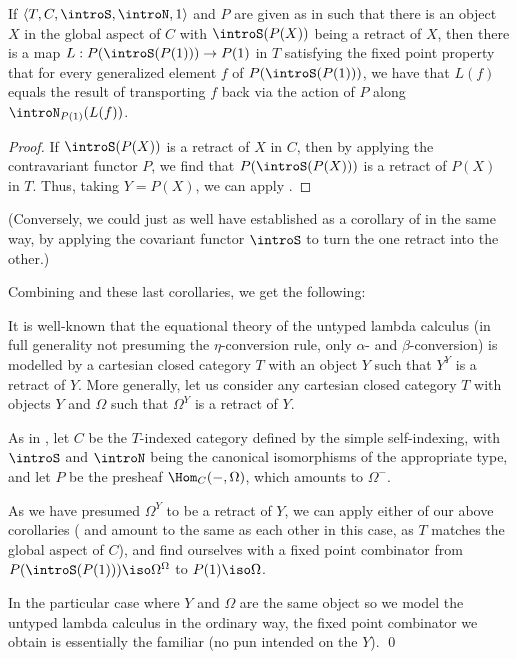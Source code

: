 \begin{corollary}\label{RetractInC}
If $\langle T, C, \introS, \introN, 1 \rangle$ and $P$ are given as in  such that there is an object $X$ in the global aspect of $C$ with $\introS(P(X))$ being a retract of $X$, then there is a map $L : P(\introS(P(1))) \to P(1)$ in $T$ satisfying the fixed point property that for every generalized element $f$ of $P(\introS(P(1)))$, we have that $L(f)$ equals the result of transporting $f$ back via the action of $P$ along $\introN_{P(1)}(L(f))$.
\end{corollary}
\begin{proof}
If $\introS(P(X))$ is a retract of $X$ in $C$, then by applying the contravariant functor $P$, we find that $P(\introS(P(X)))$ is a retract of $P(X)$ in $T$. Thus, taking $Y = P(X)$, we can apply .
\end{proof}
(Conversely, we could just as well have established  as a corollary of  in the same way, by applying the covariant functor $\introS$ to turn the one retract into the other.)

Combining  and these last corollaries, we get the following:

\label{YCombinator}
It is well-known that the equational theory of the untyped lambda calculus (in full generality not presuming the $\eta$-conversion rule, only $\alpha$- and $\beta$-conversion) is modelled by a cartesian closed category $T$ with an object $Y$ such that $Y^Y$ is a retract of $Y$. More generally, let us consider any cartesian closed category $T$ with objects $Y$ and $\Omega$ such that $\Omega^Y$ is a retract of $Y$.

As in , let $C$ be the $T$-indexed category defined by the simple self-indexing, with $\introS$ and $\introN$ being the canonical isomorphisms of the appropriate type, and let $P$ be the presheaf $\Hom_C(-, \Omega)$, which amounts to $\Omega^{-}$.

As we have presumed $\Omega^Y$ to be a retract of $Y$, we can apply either of our above corollaries ( and  amount to the same as each other in this case, as $T$ matches the global aspect of $C$), and find ourselves with a fixed point combinator from $P(\introS(P(1))) \iso \Omega^{\Omega}$ to $P(1) \iso \Omega$. 

In the particular case where $Y$ and $\Omega$ are the same object so we model the untyped lambda calculus in the ordinary way, the fixed point combinator we obtain is essentially the familiar  (no pun intended on the $Y$). \qed
{}

